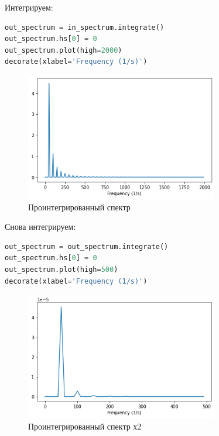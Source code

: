 \documentclass[a4paper,12pt]{report}
\begin{document}
    Интегрируем:
    
\begin{lstlisting}[language=Python,caption=Проинтегрированный спектр]
out_spectrum = in_spectrum.integrate()
out_spectrum.hs[0] = 0
out_spectrum.plot(high=2000)
decorate(xlabel='Frequency (1/s)')
\end{lstlisting}

    \begin{figure}[H]
        \centering
        \includegraphics[width=0.75\textwidth]{ex3_out_spectrum.png}
        \caption{Проинтегрированный спектр}
        \label{fig:ex3_out_spectrum}
    \end{figure}

    Снова интегрируем:
    
\begin{lstlisting}[language=Python,caption=Проинтегрированный спектр х2]
out_spectrum = out_spectrum.integrate()
out_spectrum.hs[0] = 0
out_spectrum.plot(high=500)
decorate(xlabel='Frequency (1/s)')
\end{lstlisting}

    \begin{figure}[H]
        \centering
        \includegraphics[width=0.75\textwidth]{ex3_out_spectrum_more.png}
        \caption{Проинтегрированный спектр х2}
        \label{fig:ex3_out_spectrum_more}
    \end{figure}
\end{document}
